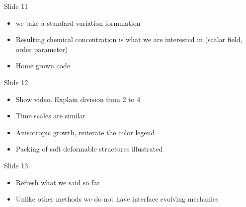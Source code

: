 \documentclass[a4paper,oneside,11pt]{report}
\begin{document}
   Slide 11
   \begin{itemize}
   	\item we take a standard variation formulation
   	\item Resulting chemical concentration is what we are interested in (scalar field, order parameter)
   	\item Home grown code
   \end{itemize}
   Slide 12
   \begin{itemize}
   	\item Show video. Explain division from 2 to 4
   	\item Time scales are similar
   	\item Anisotropic growth, reiterate the color legend
   	\item Packing of soft deformable structures illustrated
   \end{itemize}
   Slide 13
   \begin{itemize}
   	\item Refresh what we said so far
   	\item Unlike other methods we do not have interface evolving mechanics
   \end{itemize}
    
\end{document}
